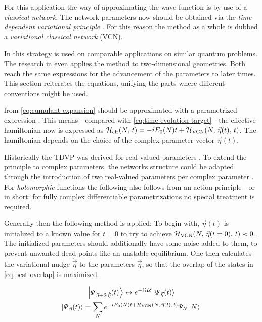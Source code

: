 For this application the way of approximating the wave-function is by use of a \emph{classical network}. 
The network parameters now should be obtained via the \emph{time-dependent variational principle} \cite{originalDerivationTimeDependendVariationalPrinciple}.
For this reason the method as a whole is dubbed a \emph{variational classical network} (VCN).

In \cite{variationalClassicalNetworksPaper} this strategy is used on comparable applications on similar quantum problems.
The research in \cite{probabilitySamplingRequirementVCN} even applies the method to two-dimensional geometries.
Both reach the same expressions for the advancement of the parameters to later times.
This section reiterates the equations, unifying the parts where different conventions might be used.

\HNOft from \autoref{eq:cumulant-expansion} should be approximated with a parametrized expression \HvcnOft{\vec{\eta}}.
This means - compared with \autoref{eq:time-evolution-target} - the effective hamiltonian now is expressed as ${\mathcal{H}_\text{eff}}^{}({N},\,t) = -i E_0(N) t + {\mathcal{H}_\text{VCN}}({N},\,{\vec{\eta}(t)},\,t)$.
The hamiltonian depends on the choice of the complex parameter vector $\vec{\eta}(t)$.

Historically the TDVP was derived for real-valued parameters \cite{originalDerivationTimeDependendVariationalPrinciple}.
To extend the principle to complex parameters, the networks structure could be adapted through the introduction of two real-valued parameters per complex parameter \cite{TDVPcomplexPrefactors}.
For \emph{holomorphic} functions the following also follows from an action-principle \cite{probabilitySamplingRequirementVCN} - or in short: for fully complex differentiable \cite{complexDifferentiation} parametrizations no special treatment is required.

Generally then the following method is applied: To begin with, $\vec{\eta}(t)$ is initialized to a known value for $t=0$ to try to achieve ${\mathcal{H}_\text{VCN}}({N},\,{\vec{\eta}(t=0)},\,t) \approx 0$.
The initialized parameters should additionally have some noise added to them, to prevent unwanted dead-points like an unstable equilibrium.
One then calculates the variational nudge $\dot{\vec{\eta}}$ to the parameters $\vec{\eta}$, so that the overlap of the states in \autoref{eq:best-overlap} is maximized.

\begin{equation}
    \label{eq:best-overlap}
    \begin{gathered}
        \ketpsiEta{\vec{\eta} + \delta \cdot \dot{\vec{\eta}}}{t} \leftrightarrow e^{-i \hamiltonian \delta} \ketpsiEta{\vec{\eta}}{t}
        \\
        \ketpsiEta{\vec{\eta}}{t} = \lsum[N] e^{-i E_0(N) t + \HvcnOft{\vec{\eta}(t)}} \psiN \ketN{}
    \end{gathered}
\end{equation}

